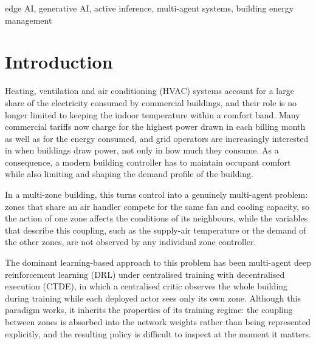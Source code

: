 \documentclass[conference]{IEEEtran}
\begin{document}
\begin{IEEEkeywords}
edge AI, generative AI, active inference, multi-agent systems, building energy management
\end{IEEEkeywords}

\section{Introduction}

Heating, ventilation and air conditioning (HVAC) systems account for a large share of the electricity consumed by commercial buildings, and their role is no longer limited to keeping the indoor temperature within a comfort band. Many commercial tariffs now charge for the highest power drawn in each billing month as well as for the energy consumed, and grid operators are increasingly interested in when buildings draw power, not only in how much they consume. As a consequence, a modern building controller has to maintain occupant comfort while also limiting and shaping the demand profile of the building.

In a multi-zone building, this turns control into a genuinely multi-agent problem: zones that share an air handler compete for the same fan and cooling capacity, so the action of one zone affects the conditions of its neighbours, while the variables that describe this coupling, such as the supply-air temperature or the demand of the other zones, are not observed by any individual zone controller.

The dominant learning-based approach to this problem has been multi-agent deep
reinforcement learning (DRL) under centralised training with decentralised execution
(CTDE), in which a centralised critic observes the whole building during
training while each deployed actor sees only its own zone. Although this
paradigm works, it inherits the properties of its training regime: the
coupling between zones is absorbed into the network weights rather than being
represented explicitly, and the resulting policy is difficult to inspect at the
moment it matters.
\end{document}

